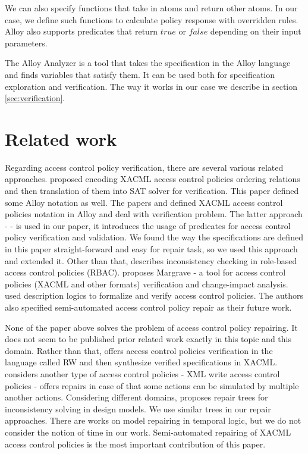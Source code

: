 \documentclass[letterpaper]{acm_proc_article-sp}
\begin{document}
We can also specify functions that take in atoms and return other atoms. In our case, we define such functions to calculate policy response with overridden rules. Alloy also supports predicates that return $true$ or $false$ depending on their input parameters.

The Alloy Analyzer is a tool that takes the specification in the Alloy language and finds variables that satisfy them. It can be used both for specification exploration and verification. The way it works in our case we describe in section \ref{sec:verification}.

\section{Related work}

Regarding access control policy verification, there are several various related approaches.
\cite{Hughes:2008:AVA:1459278.1459282} proposed encoding XACML access control policies  ordering relations and then translation of them into SAT solver for verification. This paper defined some Alloy notation as well.  The papers \cite{acp:automated} and \cite{acp:alloy} defined XACML access control policies notation in Alloy and deal with verification problem. The latter approach - \cite{acp:alloy} - is used in our paper, it introduces the usage of predicates for access control policy verification and validation. We found the way the specifications are defined in this paper straight-forward and easy for repair task, so we used this approach and extended it. Other than that, \cite{4258517} describes inconsistency checking in role-based access control policies (RBAC). \cite{Fisler:2005:VCA:1062455.1062502} proposes Margrave - a tool for access control policies (XACML and other formats) verification and change-impact analysis. \cite {acp:descriptionlogics} used description logics to formalize and verify access control policies. The authors also specified semi-automated access control policy repair as their future work.

None of the paper above solves the problem of access control policy repairing. It does not seem to be published prior related work exactly in this topic and this domain. Rather than that, \cite{Zhang:2004:SVA:1029133.1029141} offers access control policies verification in the language called RW and then synthesize verified specifications in XACML. \cite{Bravo:2007:RIX:1783534.1783545} considers another type of access control policies - XML write access control policies - offers repairs in case of that some actions can be simulated by multiple another actions. Considering different domains, \cite{Reder:2012:CRT:2351676.2351707} proposes repair trees for inconsistency solving in design models. We use similar trees in our repair approaches. There are works on model repairing in temporal logic, but we do not consider the notion of time in our work. Semi-automated repairing of XACML access control policies is the most important contribution of this paper. 
\end{document}
